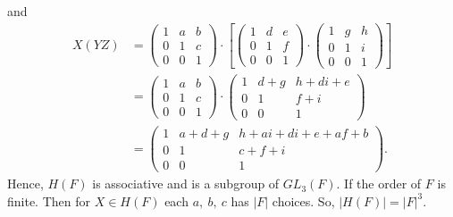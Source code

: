 \documentclass[12pt]{article}
\begin{document}
\begin{enumerate}
\begin{enumerate}
\begin{mybox}
            and
            \begin{align*}
                X(YZ)&=
                \left(\begin{array}{ccc}
                    1 & a & b\\
                    0 & 1 & c\\
                    0 & 0 & 1 \end{array}
                \right)\cdot
                \left[\left(\begin{array}{ccc}
                    1 & d & e\\
                    0 & 1 & f\\
                    0 & 0 & 1 \end{array}
                \right)\cdot
                \left(\begin{array}{ccc}
                    1 & g & h\\
                    0 & 1 & i\\
                    0 & 0 & 1 \end{array}
                \right)\right]\\
                &=\left(\begin{array}{ccc}
                    1 & a & b\\
                    0 & 1 & c\\
                    0 & 0 & 1 \end{array}
                \right)\cdot
                \left(\begin{array}{ccc}
                        1 & d+g & h+di+e\\
                        0 & 1 & f+i\\
                        0 & 0 & 1 \end{array}
                \right)\\
                &=\left(\begin{array}{ccc}
                    1 & a+d+g & h+ai+di+e+af+b\\
                    0 & 1 & c+f+i\\
                    0 & 0 & 1 \end{array}
                \right).
            \end{align*}
            Hence, $H(F)$ is associative and is a
            subgroup of $GL_3(F)$. If the order of
            $F$ is finite. Then for $X\in H(F)$
            each $a,\ b,\ c$ has
            $|F|$ choices. So, $|H(F)|=|F|^3$.
        \end{mybox}


\end{enumerate}
\end{enumerate}
\end{document}
